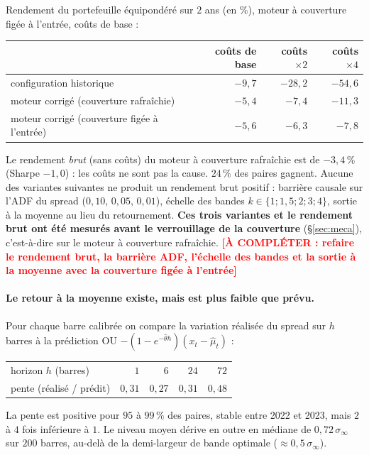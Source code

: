 \documentclass[11pt,a4paper]{article}
\theoremstyle{remark}
\newcommand{\sinf}{\sigma_\infty}
\newcommand{\acompleter}[1]{\textcolor{red}{\textbf{[À COMPLÉTER : #1]}}}
\begin{document}
Rendement du portefeuille équipondéré sur $2$ ans (en \%), moteur à couverture figée à l'entrée, coûts de base :

\begin{center}
\small
\begin{tabular}{lrrr}
\toprule
 & coûts de base & coûts $\times2$ & coûts $\times4$\\
\midrule
configuration historique & $-9{,}7$ & $-28{,}2$ & $-54{,}6$\\
moteur corrigé (couverture rafraîchie) & $-5{,}4$ & $-7{,}4$ & $-11{,}3$\\
moteur corrigé (couverture figée à l'entrée) & $-5{,}6$ & $-6{,}3$ & $-7{,}8$\\
\bottomrule
\end{tabular}
\end{center}

Le rendement \emph{brut} (sans coûts) du moteur à couverture rafraîchie est de $-3{,}4\,\%$ (Sharpe $-1{,}0$) : les coûts ne sont pas la cause. $24\,\%$ des paires gagnent.
Aucune des variantes suivantes ne produit un rendement brut positif : barrière causale sur l'ADF du spread ($0{,}10$, $0{,}05$, $0{,}01$),
échelle des bandes $k\in\{1;1{,}5;2;3;4\}$, sortie à la moyenne au lieu du retournement.
\textbf{Ces trois variantes et le rendement brut ont été mesurés avant le verrouillage de la couverture} (\S\ref{sec:meca}), c'est-à-dire sur le moteur à couverture rafraîchie.
\acompleter{refaire le rendement brut, la barrière ADF, l'échelle des bandes et la sortie à la moyenne avec la couverture figée à l'entrée}

\paragraph{Le retour à la moyenne existe, mais est plus faible que prévu.}
Pour chaque barre calibrée on compare la variation réalisée du spread sur $h$ barres à la prédiction OU $-(1-e^{-\hat\theta h})(x_t-\hat\mu_t)$ :

\begin{center}
\small
\begin{tabular}{lrrrr}
\toprule
horizon $h$ (barres) & $1$ & $6$ & $24$ & $72$\\
pente (réalisé / prédit) & $0{,}31$ & $0{,}27$ & $0{,}31$ & $0{,}48$\\
\bottomrule
\end{tabular}
\end{center}

La pente est positive pour $95$ à $99\,\%$ des paires, stable entre 2022 et 2023, mais $2$ à $4$ fois inférieure à $1$. Le niveau moyen dérive en outre en médiane de $0{,}72\,\sinf$ sur $200$ barres,
au-delà de la demi-largeur de bande optimale ($\approx0{,}5\,\sinf$).
\end{document}
